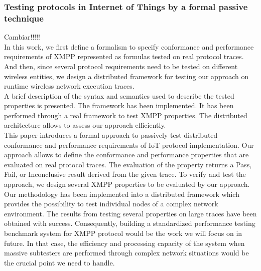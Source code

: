 \subsubsection{Testing protocols in Internet of Things by a formal passive technique}\cite{Paper11}
Cambiar!!!!!\\
In this work, we first define a formalism to specify conformance and performance requirements of XMPP
represented as formulas tested on real protocol traces. And then, since several protocol requirements need to be tested on different wireless entities, we design a distributed framework for testing our approach on runtime wireless network execution traces.\\
A brief description of the syntax and semantics used to describe the tested properties is presented. The framework has been implemented. It has been performed through a real framework to test XMPP properties. The distributed architecture allows to assess our approach efficiently.\\
This paper introduces a formal approach to passively test distributed conformance and performance requirements of IoT protocol implementation. Our approach allows to define the conformance and performance properties that are evaluated on real protocol traces. The evaluation of the property returns a Pass, Fail, or Inconclusive result derived from the given trace. To verify and test the approach, we design several XMPP properties to be evaluated by our approach. Our methodology has been implemented into a distributed framework which provides the possibility to test individual nodes of a complex network environment. The results from testing several properties on large traces have been obtained with success. Consequently, building a standardized performance testing benchmark system for XMPP protocol would be the work we will focus on in future. In that case, the efficiency and processing capacity of the system when massive subtesters are performed through complex network situations would be the crucial point we need to handle.

